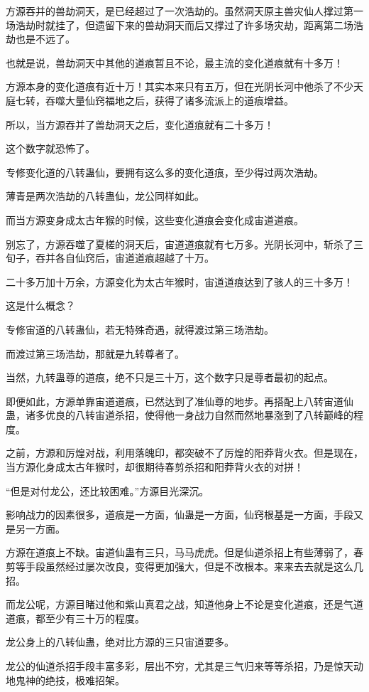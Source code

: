 \begin{this_body}
方源吞并的兽劫洞天，是已经超过了一次浩劫的。虽然洞天原主兽灾仙人撑过第一场浩劫时就挂了，但遗留下来的兽劫洞天而后又撑过了许多场灾劫，距离第二场浩劫也是不远了。

也就是说，兽劫洞天中其他的道痕暂且不论，最主流的变化道痕就有十多万！

方源本身的变化道痕有近十万！其实本来只有五万，但在光阴长河中他杀了不少天庭七转，吞噬大量仙窍福地之后，获得了诸多流派上的道痕增益。

所以，当方源吞并了兽劫洞天之后，变化道痕就有二十多万！

这个数字就恐怖了。

专修变化道的八转蛊仙，要拥有这么多的变化道痕，至少得过两次浩劫。

薄青是两次浩劫的八转蛊仙，龙公同样如此。

而当方源变身成太古年猴的时候，这些变化道痕会变化成宙道道痕。

别忘了，方源吞噬了夏槎的洞天后，宙道道痕就有七万多。光阴长河中，斩杀了三旬子，吞并各自仙窍后，宙道道痕超越了十万。

二十多万加十万余，方源变化为太古年猴时，宙道道痕达到了骇人的三十多万！

这是什么概念？

专修宙道的八转蛊仙，若无特殊奇遇，就得渡过第三场浩劫。

而渡过第三场浩劫，那就是九转尊者了。

当然，九转蛊尊的道痕，绝不只是三十万，这个数字只是尊者最初的起点。

即便如此，方源单靠宙道道痕，已然达到了准仙尊的地步。再搭配上八转宙道仙蛊，诸多优良的八转宙道杀招，使得他一身战力自然而然地暴涨到了八转巅峰的程度。

之前，方源和厉煌对战，利用落魄印，都突破不了厉煌的阳莽背火衣。但是现在，当方源化身成太古年猴时，却很期待春剪杀招和阳莽背火衣的对拼！

“但是对付龙公，还比较困难。”方源目光深沉。

影响战力的因素很多，道痕是一方面，仙蛊是一方面，仙窍根基是一方面，手段又是另一方面。

方源在道痕上不缺。宙道仙蛊有三只，马马虎虎。但是仙道杀招上有些薄弱了，春剪等手段虽然经过屡次改良，变得更加强大，但是不改根本。来来去去就是这么几招。

而龙公呢，方源目睹过他和紫山真君之战，知道他身上不论是变化道痕，还是气道道痕，都至少有三十万的程度。

龙公身上的八转仙蛊，绝对比方源的三只宙道要多。

龙公的仙道杀招手段丰富多彩，层出不穷，尤其是三气归来等等杀招，乃是惊天动地鬼神的绝技，极难招架。


\end{this_body}
